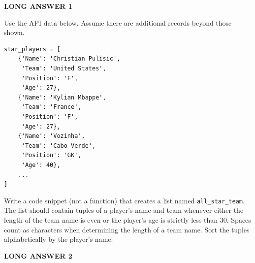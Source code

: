 \documentclass[11pt,addpoints]{exam}
\newcommand{\answerbox}{%
  \par\vspace{0.3em}%
  \noindent\fbox{\parbox[t][1.75in][t]{\dimexpr\linewidth-2\fboxsep-2\fboxrule\relax}{\strut}}%
  \par
}
\begin{document}
\begin{questions}
\begin{parts}
\end{parts}

\newpage
\question[8] \textbf{LONG ANSWER 1}

Use the API data below. Assume there are additional records beyond those shown.
\begin{lstlisting}
star_players = [
    {'Name': 'Christian Pulisic',
     'Team': 'United States',
     'Position': 'F',
     'Age': 27},
    {'Name': 'Kylian Mbappe',
     'Team': 'France',
     'Position': 'F',
     'Age': 27},
    {'Name': 'Vozinha',
     'Team': 'Cabo Verde',
     'Position': 'GK',
     'Age': 40},
    ...
]
\end{lstlisting}

Write a code snippet (not a function) that creates a list named \texttt{all\_star\_team}. The list should contain tuples of a player's name and team whenever either the length of the team name is even or the player's age is strictly less than 30. Spaces count as characters when determining the length of a team name. Sort the tuples alphabetically by the player's name.

\par\vspace{0.5em}
\noindent\fbox{\parbox[t][3.75in][t]{\dimexpr\linewidth-2\fboxsep-2\fboxrule\relax}{\strut}}
\vfill

\newpage
\question[12] \textbf{LONG ANSWER 2}


\end{questions}
\end{document}
